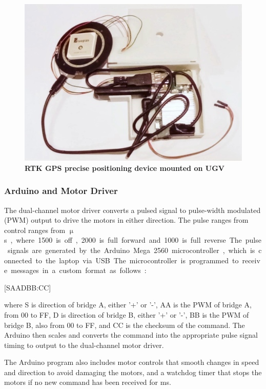 \documentclass[titlepage,12pt,a4paper]{article}
\begin{document}
\begin{figure}[h]
	\centering
	\includegraphics[scale=0.2]{figures/rtk_gps.jpg}
	\caption{\textbf{RTK GPS precise positioning device mounted on UGV}}
	\label{figure:RTK_GPS_device}
\end{figure}

\subsubsection{Arduino and Motor Driver}
\label{motor_driver_explanation}

The dual-channel motor driver converts a pulsed signal to pulse-width modulated (PWM) output to drive the motors in either direction. The pulse ranges from control ranges from \unit[1000-2000]{$\upmu$s}, where 1500 is off, 2000 is full forward and 1000 is full reverse. The pulse signals are generated by the Arduino Mega 2560 microcontroller, which is connected to the laptop via USB.. The microcontroller is programmed to receive messages in a custom format as follows:

\begin{center}
	[SAADBB:CC]
\end{center}

where S is direction of bridge A, either '+' or '-', AA is the PWM of bridge A, from 00 to FF, D is direction of bridge B, either '+' or '-', BB is the PWM of bridge B, also from 00 to FF, and CC is the checksum of the command. The Arduino then scales and converts the command into the appropriate pulse signal timing to output to the dual-channel motor driver.

The Arduino program also includes motor controls that smooth changes in speed and direction to avoid damaging the motors, and a watchdog timer that stops the motors if no new command has been received for \unit[500]{ms}.
\end{document}
